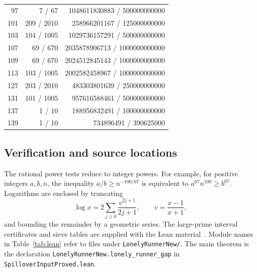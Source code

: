 \documentclass[11pt,a4paper]{article}
\begin{document}
\begin{longtable}{@{}rrr@{}}
97 & 7 / 67 & 1048611830883 / 500000000000 \\
101 & 209 / 2010 & 258966201167 / 125000000000 \\
103 & 104 / 1005 & 1029736157291 / 500000000000 \\
107 & 69 / 670 & 2035878906713 / 1000000000000 \\
109 & 69 / 670 & 2024512845143 / 1000000000000 \\
113 & 103 / 1005 & 2002582458967 / 1000000000000 \\
127 & 203 / 2010 & 483303801639 / 250000000000 \\
131 & 101 / 1005 & 957616588461 / 500000000000 \\
137 & 1 / 10 & 188956832491 / 100000000000 \\
139 & 1 / 10 & 734896491 / 390625000 \\
\end{longtable}
\endgroup

\subsection{Verification and source locations}

The rational power tests reduce to integer powers. For example,
for positive integers \(a,b,n\), the inequality
\(a/b\ge n^{-100/67}\) is equivalent to \(a^{67}n^{100}\ge b^{67}\).
Logarithms are enclosed by truncating
\[
 \log x=2\sum_{j\ge0}\frac{v^{2j+1}}{2j+1},
 \qquad v=\frac{x-1}{x+1},
\]
and bounding the remainder by a geometric series. The large-prime
interval certificates and sieve tables are supplied with the Lean
material~\cite{LeanCode}. Module names in Table~\ref{tab:lean}
refer to files under \texttt{LonelyRunnerNew/}.
The main theorem is the declaration \texttt{LonelyRunnerNew.lonely\_runner\_gap}
in \texttt{SpilloverInputProved.lean}.
\end{document}
